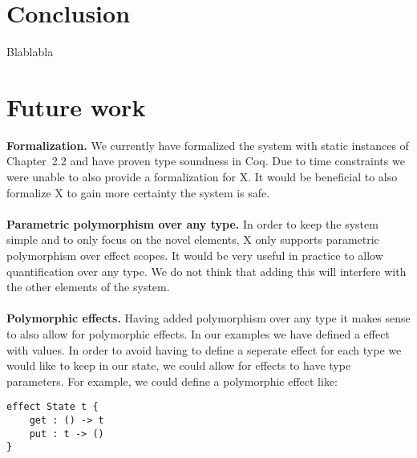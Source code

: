 \section{Conclusion}
Blablabla

\section{Future work}

\textbf{Formalization.}
We currently have formalized the system with static instances of Chapter~2.2 and have proven type soundness in Coq.
Due to time constraints we were unable to also provide a formalization for X.
It would be beneficial to also formalize X to gain more certainty the system is safe.
\\\\
\textbf{Parametric polymorphism over any type.}
In order to keep the system simple and to only focus on the novel elements, X only supports parametric polymorphism over effect scopes.
It would be very useful in practice to allow quantification over any type.
We do not think that adding this will interfere with the other elements of the system.
\\\\
\textbf{Polymorphic effects.}
Having added polymorphism over any type it makes sense to also allow for polymorphic effects.
In our examples we have defined a  effect with  values.
In order to avoid having to define a seperate effect for each type we would like to keep in our state, we could allow for effects to have type parameters.
For example, we could define a polymorphic  effect like:
\begin{verbatim}
effect State t {
	get : () -> t
	put : t -> ()
}
\end{verbatim}


